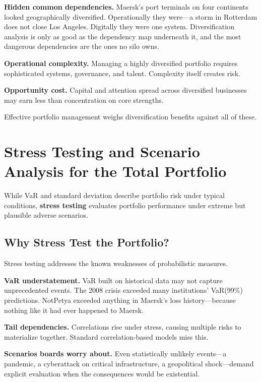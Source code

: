 \documentclass[11pt,openany]{book}
\begin{document}
\textbf{Hidden common dependencies.} Maersk's port terminals on four
continents looked geographically diversified. Operationally they were---a
storm in Rotterdam does not close Los Angeles. Digitally they were one system.
Diversification analysis is only as good as the dependency map underneath it,
and the most dangerous dependencies are the ones no silo owns.

\textbf{Operational complexity.} Managing a highly diversified portfolio
requires sophisticated systems, governance, and talent. Complexity itself
creates risk.

\textbf{Opportunity cost.} Capital and attention spread across diversified
businesses may earn less than concentration on core strengths.

Effective portfolio management weighs diversification benefits against all of
these.

\section{Stress Testing and Scenario Analysis for the Total Portfolio}
\label{sec:stress-testing}

While VaR and standard deviation describe portfolio risk under typical
conditions, \textbf{stress testing} evaluates portfolio performance under
extreme but plausible adverse scenarios.

\subsection{Why Stress Test the Portfolio?}
\label{subsec:why-stress-test}

Stress testing addresses the known weaknesses of probabilistic measures.

\textbf{VaR understatement.} VaR built on historical data may not capture
unprecedented events. The 2008 crisis exceeded many institutions' VaR(99\%)
predictions. NotPetya exceeded anything in Maersk's loss history---because
nothing like it had ever happened to Maersk.

\textbf{Tail dependencies.} Correlations rise under stress, causing multiple
risks to materialize together. Standard correlation-based models miss this.

\textbf{Scenarios boards worry about.} Even statistically unlikely events---a
pandemic, a cyberattack on critical infrastructure, a geopolitical
shock---demand explicit evaluation when the consequences would be existential.
\end{document}
